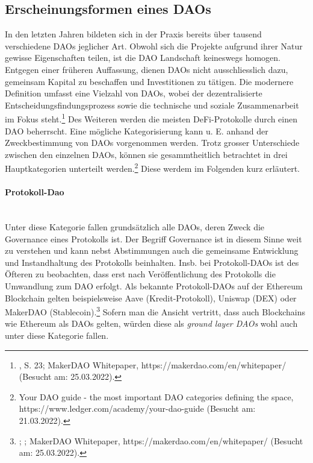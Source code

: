 \documentclass[a4paper,12pt]{report}
\begin{document}
        \subsection{Erscheinungsformen eines DAOs} \label{ErscheinungsformenDAO}
        \startsubsection
        In den letzten Jahren bildeten sich in der Praxis bereits über tausend verschiedene DAOs jeglicher Art. Obwohl sich die Projekte aufgrund ihrer Natur gewisse Eigenschaften teilen, ist die DAO Landschaft keineswegs homogen. Entgegen einer früheren  Auffassung, dienen DAOs nicht ausschliesslich dazu, gemeinsam Kapital zu beschaffen und Investitionen zu tätigen. Die modernere Definition umfasst eine Vielzahl von DAOs, wobei der dezentralisierte Entscheidungsfindungsprozess sowie die technische und soziale Zusammenarbeit im Fokus steht.\footnote{\hspace{0.5em}\begin{minipage}[t]{13cm}\citeauthor{ETH14}, S. 23; MakerDAO Whitepaper, https://makerdao.com/en/whitepaper/ (Besucht am: 25.03.2022).\end{minipage}} Des Weiteren werden die meisten DeFi-Protokolle durch einen DAO beherrscht. Eine mögliche  Kategorisierung kann u. E. anhand der Zweckbestimmung von DAOs vorgenommen werden. Trotz grosser Unterschiede zwischen den einzelnen DAOs, können sie gesammtheitlich betrachtet in drei Hauptkategorien unterteilt werden.\footnote{\hspace{0.5em}\begin{minipage}[t]{13cm}Your DAO guide - the most important DAO categories defining the space, https://www.ledger.com/academy/your-dao-guide (Besucht am: 21.03.2022).\end{minipage}} Diese werdem im Folgenden kurz erläutert.
        \paragraph{Protokoll-Dao} \hfill \\
        Unter diese Kategorie fallen grundsätzlich alle DAOs, deren Zweck die Governance eines Protokolls ist. Der Begriff Governance ist in diesem Sinne weit zu verstehen und kann nebst Abstimmungen auch die gemeinsame Entwicklung und Instandhaltung des Protokolls beinhalten. Insb. bei Protokoll-DAOs ist des Öfteren zu beobachten, dass erst nach Veröffentlichung des Protokolls die Umwandlung zum DAO erfolgt. Als bekannte Protokoll-DAOs auf der Ethereum Blockchain gelten beispielsweise Aave (Kredit-Protokoll), Uniswap (DEX) oder MakerDAO (Stablecoin).\footnote{\hspace{0.5em}\begin{minipage}[t]{13cm}\citeauthor{Aave}; \citeauthor{Uniswap}; MakerDAO Whitepaper, https://makerdao.com/en/whitepaper/ (Besucht am: 25.03.2022).\end{minipage}} Sofern man die Ansicht vertritt, dass auch Blockchains wie Ethereum als DAOs gelten, würden diese als \textit{ground layer DAOs} wohl auch unter diese Kategorie fallen.
        
\end{document}
